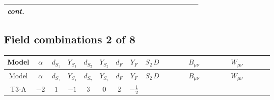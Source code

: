 \documentclass[8pt]{article}
\begin{document}
\begin{landscape}
\begin{longtable}{@{}cccccccc >{\raggedright\arraybackslash}p{0.21\linewidth} >{\raggedright\arraybackslash}p{0.21\linewidth} >{\raggedright\arraybackslash}p{0.21\linewidth}@{}}
\textit{cont.} &  &  &  &  &  &  &  &  &  & \scriptsize\adjustbox{max width=\linewidth}{$\begin{gathered} -\frac{2 \hbar  \overline{y_{2,i_1,r_1}} S_{2,j_3} S_{2,j_4} y_{2,i_1,r_1} S_{2,j_1}{}^{\dagger } S_{2,j_2}{}^{\dagger } \mathcal{I}_{S_2,j_1,j_3,j_2,j_4}{}^2 \lambda_{S_2}^{(1)}^{(2)}}{\sqrt{3} \epsilon } \\ -\frac{\hbar  \overline{y_{2,i_1,r_1}} S_{2,j_3} S_{2,j_4} y_{2,i_1,r_1} S_{2,j_1}{}^{\dagger } S_{2,j_2}{}^{\dagger } \mathcal{I}_{S_2,j_1,j_3,j_2,j_4}{}^2 \lambda_{S_2}^{(1)}^{(2)}}{\sqrt{3}}\end{gathered}$} \\
\midrule
\bottomrule
\end{longtable}
\clearpage
\subsection*{Field combinations 2 of 8}
\begin{longtable}{@{}cccccccc >{\raggedright\arraybackslash}p{0.21\linewidth} >{\raggedright\arraybackslash}p{0.21\linewidth} >{\raggedright\arraybackslash}p{0.21\linewidth}@{}}
\toprule
Model & $\alpha$ & $d_{S_1}$ & $Y_{S_1}$ & $d_{S_2}$ & $Y_{S_2}$ & $d_F$ & $Y_F$ & $S_2\,D$ & $B_{\mu\nu}$ & $W_{\mu\nu}$ \\
\midrule
\endfirsthead
\toprule
Model & $\alpha$ & $d_{S_1}$ & $Y_{S_1}$ & $d_{S_2}$ & $Y_{S_2}$ & $d_F$ & $Y_F$ & $S_2\,D$ & $B_{\mu\nu}$ & $W_{\mu\nu}$ \\
\midrule
\endhead
T3-A & $-2$ & $1$ & $-1$ & $3$ & $0$ & $2$ & $-\frac{1}{2}$ & \scriptsize\adjustbox{max width=\linewidth}{$\begin{gathered} +D_{\mu _1}\left(S_{2,j_1}\right){}^{\dagger } D_{\mu _1}\left(S_{2,j_1}\right)\end{gathered}$} & \scriptsize\adjustbox{max width=\linewidth}{$\begin{gathered} -\frac{\hbar  B_{\mu _1\mu _2}^2}{2 \epsilon }\end{gathered}$} & \scriptsize\adjustbox{max width=\linewidth}{$\begin{gathered} -\frac{\hbar  \left(W_{\mu _1\mu _2}^{A_1}\right){}^2}{2 \epsilon }\end{gathered}$} \\
\midrule
\bottomrule
\end{longtable}
\clearpage

\end{landscape}
\end{document}
